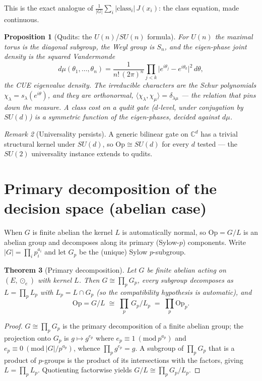 \documentclass[11pt,a4paper]{article}
\newcommand{\Op}{\mathrm{Op}}
\theoremstyle{plain}
\newtheorem{theorem}{Theorem}
\newtheorem{proposition}[theorem]{Proposition}
\theoremstyle{definition}
\theoremstyle{remark}
\newtheorem{remark}[theorem]{Remark}
\begin{document}
This is the exact analogue of $\frac{1}{|G|}\sum_i |\text{class}_i|\,J(x_i)$:
the class equation, made continuous.

\begin{proposition}[Qudits: the $U(n)$/$SU(n)$ formula]\label{prop:sun}
For $U(n)$ the maximal torus is the diagonal subgroup, the Weyl group is $S_n$,
and the eigen-phase joint density is the squared Vandermonde
\[
d\mu(\theta_1,\dots,\theta_n)=\frac{1}{n!\,(2\pi)^n}
\prod_{j<k}\bigl|e^{i\theta_j}-e^{i\theta_k}\bigr|^2\,d\theta,
\]
the CUE eigenvalue density. The irreducible characters are the Schur
polynomials $\chi_\lambda=s_\lambda(e^{i\theta})$, and they are orthonormal,
$\langle\chi_\lambda,\chi_\mu\rangle=\delta_{\lambda\mu}$ --- the relation that
pins down the measure. A class cost on a qudit gate ($d$-level, under
conjugation by $SU(d)$) is a symmetric function of the eigen-phases, decided
against $d\mu$.
\end{proposition}

\begin{remark}[Universality persists]
A generic bilinear gate on $\mathbb{C}^d$ has a trivial structural kernel under
$SU(d)$, so $\Op\cong SU(d)$ for every $d$ tested --- the $SU(2)$ universality
instance extends to qudits.
\end{remark}

\section{Primary decomposition of the decision space (abelian case)}

When $G$ is finite abelian the kernel $L$ is automatically normal, so
$\Op=G/L$ is an abelian group and decomposes along its primary (Sylow-$p$)
components. Write $|G|=\prod_i p_i^{a_i}$ and let $G_p$ be the (unique) Sylow
$p$-subgroup.

\begin{theorem}[Primary decomposition]\label{thm:primary}
Let $G$ be finite abelian acting on $(E,\odot_e)$ with kernel $L$. Then
$G\cong\prod_p G_p$, every subgroup decomposes as $L=\prod_p L_p$ with
$L_p=L\cap G_p$ (so the compatibility hypothesis is automatic), and
\[
\Op = G/L \;\cong\; \prod_p\, G_p/L_p \;=\; \prod_p \Op_p .
\]
\end{theorem}

\begin{proof}
$G\cong\prod_p G_p$ is the primary decomposition of a finite abelian group; the
projection onto $G_p$ is $g\mapsto g^{e_p}$ where $e_p\equiv 1\ (\mathrm{mod}\ p^{a_p})$
and $e_p\equiv 0\ (\mathrm{mod}\ |G|/p^{a_p})$, whence $\prod_p g^{e_p}=g$. A
subgroup of $\prod_p G_p$ that is a product of $p$-groups is the product of its
intersections with the factors, giving $L=\prod_p L_p$. Quotienting factorwise
yields $G/L\cong\prod_p G_p/L_p$.
\end{proof}
\end{document}
